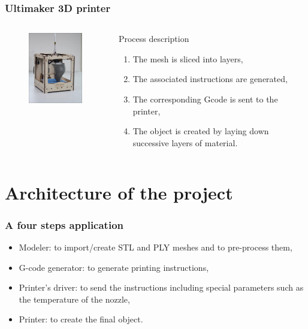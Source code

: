 \documentclass{beamer}
\begin{document}
\begin{frame}
	\frametitle{Ultimaker 3D printer}
	
	\begin{columns}[t]
  	\begin{column}{5cm}
  		\begin{figure}
		\includegraphics[width=4cm]{Ultimaker}	
		\end{figure}
  	\end{column}
  
  	\begin{column}{5cm}
  		\begin{block}{Process description}
  		\begin{enumerate}
  		\item The mesh is sliced into layers,
  		\item The associated instructions are generated,
  		\item The corresponding Gcode is sent to the printer,
  		\item The object is created by laying down successive layers of material.
  		\end{enumerate}
 	 	\end{block}   
  	\end{column}
 	\end{columns}  
\end{frame}



\section{Architecture of the project}

\begin{frame}
	\frametitle{A four steps application}
	
	\begin{block}{}
		\begin{itemize}
			\item Modeler: to import/create STL and PLY meshes and to pre-process them,
			\item G-code generator: to generate printing instructions,
			\item Printer's driver: to send the instructions including special parameters such as the temperature of the nozzle,
			\item Printer: to create the final object.
		\end{itemize}
	\end{block}
	
\end{frame}
\end{document}
